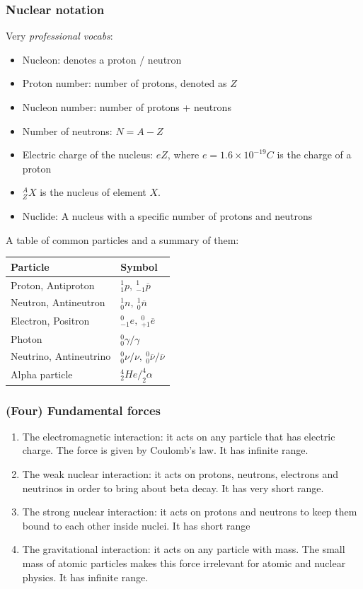 \documentclass[a4paper,12pt]{article}
\begin{document}
\subsubsection*{Nuclear notation}
Very \textit{professional vocabs}:
\begin{itemize}
  \item Nucleon: denotes a proton / neutron
  \item Proton number: number of protons, denoted as $Z$
  \item Nucleon number: number of protons + neutrons
  \item Number of neutrons: $N=A-Z$
  \item Electric charge of the nucleus: $eZ$, where $e=1.6\times 10^{-19}C$ is the charge of a proton
  \item $^A_ZX$ is the nucleus of element $X$.
  \item Nuclide: A nucleus with a specific number of protons and neutrons
\end{itemize}
A table of common particles and a summary of them:
\begin{center}
\begin{tabularx}{\textwidth}{@{}|Y | Y|@{}}
\toprule
\textbf{Particle} & \textbf{Symbol} \\
\midrule 
Proton, Antiproton & $^1_1p,\ ^1_{-1}\overline{p}$\\
\midrule
Neutron, Antineutron & $^1_0n,\ ^1_0\overline{n}$\\
\midrule
Electron, Positron & $^0_{-1}e,\ ^0_{+1}\overline{e}$\\
\midrule
Photon & $^0_0\gamma/\gamma$ \\
\midrule
Neutrino, Antineutrino & $^0_0\nu/\nu,\ ^0_0\overline{\nu}/\overline{\nu}$ \\
\midrule
Alpha particle & $^4_2He/^4_2\alpha$ \\
\bottomrule 
\end{tabularx}
\end{center}
\subsubsection*{(Four) Fundamental forces}
\begin{enumerate}
  \item The electromagnetic interaction: it acts on any particle that has electric charge. The force is given by Coulomb's law. It has infinite range.
  \item The weak nuclear interaction: it acts on protons, neutrons, electrons and neutrinos in order to bring about beta decay. It has very short range.
  \item The strong nuclear interaction: it acts on protons and neutrons to keep them bound to each other inside nuclei. It has short range
  \item The gravitational interaction: it acts on any particle with mass. The small mass of atomic particles makes this force irrelevant for atomic and nuclear physics. It has infinite range.
\end{enumerate}
\end{document}
